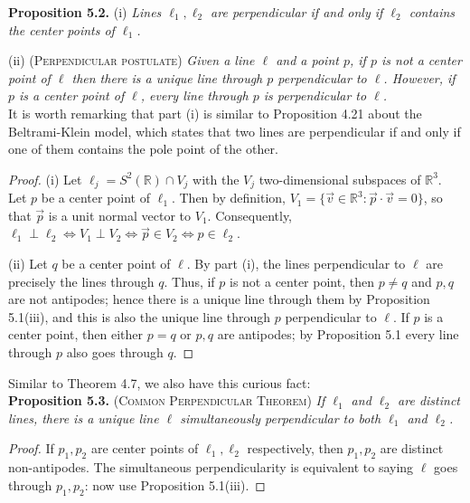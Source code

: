 \documentclass[leqno]{book}
\begin{document}
\noindent\textbf{Proposition 5.2.} (i) \emph{Lines $\ell_1,\ell_2$ are perpendicular if and only if $\ell_2$ contains the center points of $\ell_1$.}

(ii) \textsc{(Perpendicular postulate)} \emph{Given a line $\ell$ and a point $p$, if $p$ is not a center point of $\ell$ then there is a unique line through $p$ perpendicular to $\ell$.  However, if $p$ is a center point of $\ell$, every line through $p$ is perpendicular to $\ell$.}\\

\noindent It is worth remarking that part (i) is similar to Proposition 4.21 about the Beltrami-Klein model, which states that two lines are perpendicular if and only if one of them contains the pole point of the other.
\begin{proof}
(i) Let $\ell_j=S^2(\mathbb R)\cap V_j$ with the $V_j$ two-dimensional subspaces of $\mathbb R^3$.  Let $p$ be a center point of $\ell_1$.  Then by definition, $V_1=\{\vec v\in\mathbb R^3:\vec p\cdot\vec v=0\}$, so that $\vec p$ is a unit normal vector to $V_1$.  Consequently, $\ell_1\perp\ell_2\iff V_1\perp V_2\iff\vec p\in V_2\iff p\in\ell_2$.

(ii) Let $q$ be a center point of $\ell$.  By part (i), the lines perpendicular to $\ell$ are precisely the lines through $q$.  Thus, if $p$ is not a center point, then $p\ne q$ and $p,q$ are not antipodes; hence there is a unique line through them by Proposition 5.1(iii), and this is also the unique line through $p$ perpendicular to $\ell$.  If $p$ is a center point, then either $p=q$ or $p,q$ are antipodes; by Proposition 5.1 every line through $p$ also goes through $q$.
\end{proof}

\noindent Similar to Theorem 4.7, we also have this curious fact:\\

\noindent\textbf{Proposition 5.3.} \textsc{(Common Perpendicular Theorem)} \emph{If $\ell_1$ and $\ell_2$ are distinct lines, there is a unique line $\ell$ simultaneously perpendicular to both $\ell_1$ and $\ell_2$.}
\begin{proof}
If $p_1,p_2$ are center points of $\ell_1,\ell_2$ respectively, then $p_1,p_2$ are distinct non-antipodes.  The simultaneous perpendicularity is equivalent to saying $\ell$ goes through $p_1,p_2$: now use Proposition 5.1(iii).
\end{proof}
\end{document}
